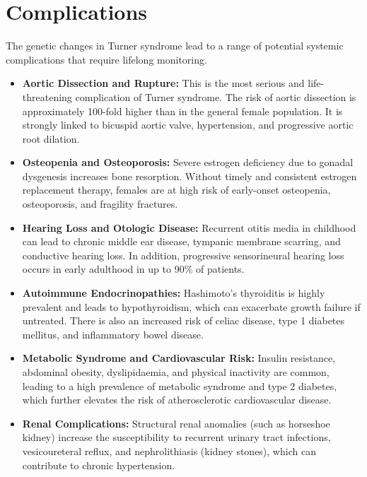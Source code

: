 \section*{Complications}
The genetic changes in Turner syndrome lead to a range of potential systemic complications that require lifelong monitoring.
\begin{itemize}
    \item \textbf{Aortic Dissection and Rupture:} This is the most serious and life-threatening complication of Turner syndrome. The risk of aortic dissection is approximately 100-fold higher than in the general female population. It is strongly linked to bicuspid aortic valve, hypertension, and progressive aortic root dilation.
    \item \textbf{Osteopenia and Osteoporosis:} Severe estrogen deficiency due to gonadal dysgenesis increases bone resorption. Without timely and consistent estrogen replacement therapy, females are at high risk of early-onset osteopenia, osteoporosis, and fragility fractures.
    \item \textbf{Hearing Loss and Otologic Disease:} Recurrent otitis media in childhood can lead to chronic middle ear disease, tympanic membrane scarring, and conductive hearing loss. In addition, progressive sensorineural hearing loss occurs in early adulthood in up to 90\% of patients.
    \item \textbf{Autoimmune Endocrinopathies:} Hashimoto's thyroiditis is highly prevalent and leads to hypothyroidism, which can exacerbate growth failure if untreated. There is also an increased risk of celiac disease, type 1 diabetes mellitus, and inflammatory bowel disease.
    \item \textbf{Metabolic Syndrome and Cardiovascular Risk:} Insulin resistance, abdominal obesity, dyslipidaemia, and physical inactivity are common, leading to a high prevalence of metabolic syndrome and type 2 diabetes, which further elevates the risk of atherosclerotic cardiovascular disease.
    \item \textbf{Renal Complications:} Structural renal anomalies (such as horseshoe kidney) increase the susceptibility to recurrent urinary tract infections, vesicoureteral reflux, and nephrolithiasis (kidney stones), which can contribute to chronic hypertension.
\end{itemize}

